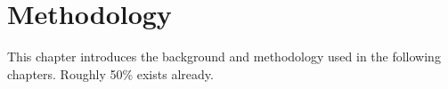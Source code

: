 \chapter{Methodology}
This chapter introduces the background and methodology used in the following chapters. Roughly 50\% exists already.






